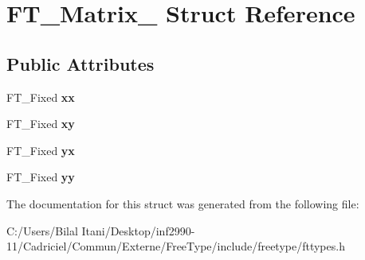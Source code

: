 \hypertarget{struct_f_t___matrix__}{}\section{F\+T\+\_\+\+Matrix\+\_\+ Struct Reference}
\label{struct_f_t___matrix__}
\subsection*{Public Attributes}
\begin{DoxyCompactItemize}
\item 
F\+T\+\_\+\+Fixed {\bfseries xx}\hypertarget{struct_f_t___matrix___a27d51c2958634abe7bf377610e095f74}{}\label{struct_f_t___matrix___a27d51c2958634abe7bf377610e095f74}

\item 
F\+T\+\_\+\+Fixed {\bfseries xy}\hypertarget{struct_f_t___matrix___a7e9f439d37c00ba1a11919bcaa8937a2}{}\label{struct_f_t___matrix___a7e9f439d37c00ba1a11919bcaa8937a2}

\item 
F\+T\+\_\+\+Fixed {\bfseries yx}\hypertarget{struct_f_t___matrix___a55792583a843a1611b43c40534a02a17}{}\label{struct_f_t___matrix___a55792583a843a1611b43c40534a02a17}

\item 
F\+T\+\_\+\+Fixed {\bfseries yy}\hypertarget{struct_f_t___matrix___a689a6fd20a88238788b90c3597ee0c2a}{}\label{struct_f_t___matrix___a689a6fd20a88238788b90c3597ee0c2a}

\end{DoxyCompactItemize}


The documentation for this struct was generated from the following file\+:\begin{DoxyCompactItemize}
\item 
C\+:/\+Users/\+Bilal Itani/\+Desktop/inf2990-\/11/\+Cadriciel/\+Commun/\+Externe/\+Free\+Type/include/freetype/fttypes.\+h\end{DoxyCompactItemize}
